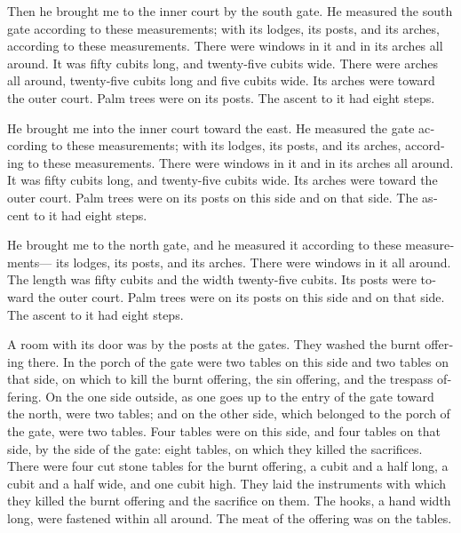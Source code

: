 \begin{paracol}{2}
\begin{otherlanguage}{english}
 Then he brought me to the inner court by the south gate.
He measured the south gate according to these measurements;
 with its lodges, its posts, and its arches, according to
these measurements. There were windows in it and in its arches all
around. It was fifty cubits long, and twenty-five cubits wide.
 There were arches all around, twenty-five cubits long
and five cubits wide.  Its arches were toward the outer
court. Palm trees were on its posts. The ascent to it had eight steps.

 He brought me into the inner court toward the east. He
measured the gate according to these measurements;  with
its lodges, its posts, and its arches, according to these measurements.
There were windows in it and in its arches all around. It was fifty
cubits long, and twenty-five cubits wide.  Its arches
were toward the outer court. Palm trees were on its posts on this side
and on that side. The ascent to it had eight steps.

 He brought me to the north gate, and he measured it
according to these measurements---  its lodges, its
posts, and its arches. There were windows in it all around. The length
was fifty cubits and the width twenty-five cubits.  Its
posts were toward the outer court. Palm trees were on its posts on this
side and on that side. The ascent to it had eight steps.

 A room with its door was by the posts at the gates. They
washed the burnt offering there.  In the porch of the
gate were two tables on this side and two tables on that side, on which
to kill the burnt offering, the sin offering, and the trespass offering.
 On the one side outside, as one goes up to the entry of
the gate toward the north, were two tables; and on the other side, which
belonged to the porch of the gate, were two tables.  Four
tables were on this side, and four tables on that side, by the side of
the gate: eight tables, on which they killed the sacrifices.
 There were four cut stone tables for the burnt offering,
a cubit and a half long, a cubit and a half wide, and one cubit high.
They laid the instruments with which they killed the burnt offering and
the sacrifice on them.  The hooks, a hand width long,
were fastened within all around. The meat of the offering was on the
tables.


\end{otherlanguage}
\end{paracol}
